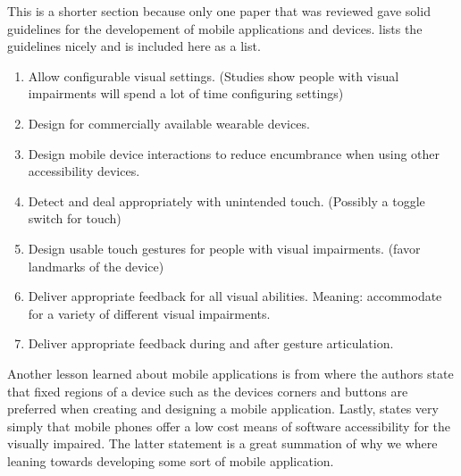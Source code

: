 \documentclass{article}
\begin{document}
\par This is a shorter section because only one paper that was reviewed gave solid guidelines for the developement of mobile applications and devices. \cite{doi:10.1080/10447318.2017.1279827} lists the guidelines nicely and is included here as a list.
\begin{enumerate}
    \item Allow configurable visual settings. (Studies show people with visual impairments will spend a lot of time configuring settings) 
    \item Design for commercially available wearable devices. 
    \item Design mobile device interactions to reduce encumbrance when using other accessibility devices.
    \item Detect and deal appropriately with unintended touch. (Possibly a toggle switch for touch) 
    \item Design usable touch gestures for people with visual impairments. (favor landmarks of the device)
    \item Deliver appropriate feedback for all visual abilities. Meaning: accommodate for a variety of different visual impairments.
    \item Deliver appropriate feedback during and after gesture articulation.
\end{enumerate}
Another lesson learned about mobile applications is from \cite{RODRIGUEZSANCHEZ20147210} where the authors state that fixed regions of a device such as the devices corners and buttons are preferred when creating and designing a mobile application. Lastly, \cite{bandyopadhyay2017sound} states very simply that mobile phones offer a low cost means of software accessibility for the visually impaired. The latter statement is a great summation of why we where leaning towards developing some sort of mobile application.
\end{document}
